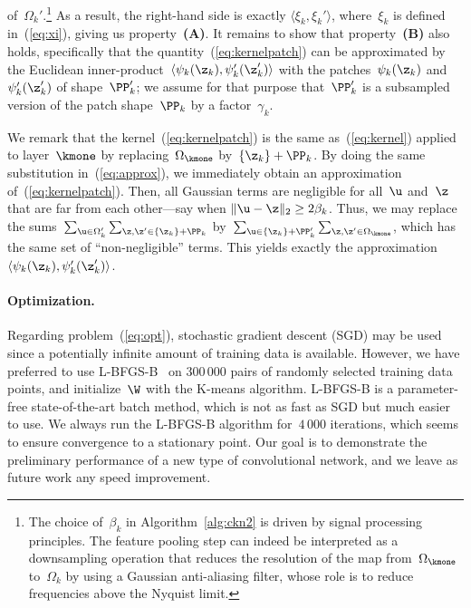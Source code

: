 of~$\Omega_k'$.\footnote{The choice of~$\beta_k$ in Algorithm~\ref{alg:ckn2} is
driven by signal processing principles. The feature pooling step can indeed be
interpreted as a downsampling operation that reduces the resolution of the map
from~$\Omega_{\kmone}$ to~$\Omega_k$ by using a Gaussian anti-aliasing filter,
whose role is to reduce frequencies
above the Nyquist limit.} As a result, the right-hand side is exactly $\langle
\xi_{k}, \xi_k' \rangle$, where~$\xi_k$ is defined in~(\ref{eq:xi}), giving us
property~{\bfseries (A)}. It remains to show that property~{\bfseries (B)} also
holds, specifically that the quantity~(\ref{eq:kernelpatch}) can be
approximated by the Euclidean inner-product~$\langle\psi_{k}(\z_k),
\psi'_k(\z_k')\rangle$ with the patches~$\psi_k(\z_k)$ and~$\psi'_k(\z_k')$ of shape~$\PP_k'$; we assume for that purpose that~$\PP_k'$ is a
subsampled version of the patch shape~$\PP_k$ by a factor~$\gamma_k$.

We remark that the kernel~(\ref{eq:kernelpatch}) is the same
as~(\ref{eq:kernel}) applied to layer~$\kmone$ by replacing~$\Omega_{\kmone}$
by~$\{\z_k\}+\PP_k$. By doing the same substitution in~(\ref{eq:approx}), we
immediately obtain an approximation of~(\ref{eq:kernelpatch}). Then, all
Gaussian terms are negligible for all~$\u$ and~$\z$ that are far from each
other---say when $\|\u-\z\|_2 \geq 2\beta_k$. Thus, we may replace the
sums~$\sum_{\u \in \Omega_k'}\sum_{\z,\z' \in \{\z_k\}+\PP_k}$ by~$\sum_{\u \in \{\z_k\}+\PP_k'}\sum_{\z,\z' \in \Omega_{\kmone}}$,
which has the same set of ``non-negligible'' terms. This yields exactly the
approximation $\langle\psi_{k}(\z_k), \psi'_k(\z_k')\rangle$.

\vs
\paragraph{Optimization.} 
Regarding problem~(\ref{eq:opt}), stochastic gradient descent
(SGD) may be used since a potentially infinite amount of training
data is available. However, we have preferred to use
L-BFGS-B~\cite{byrd1995} on $300\,000$ pairs of randomly selected training data
points, and initialize~$\W$ with the K-means algorithm. L-BFGS-B
is a parameter-free state-of-the-art batch method, which is not as
fast as SGD but much easier to use. We always run the L-BFGS-B algorithm for~$4\,000$ iterations, which seems to ensure
convergence to a stationary point. Our goal is to demonstrate the preliminary
performance of a new type of convolutional network, and we leave as future work
any speed improvement. 
\vsb
